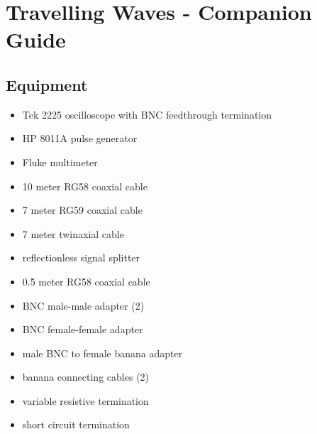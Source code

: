 \AtEndDocument{\clearpage\ifodd\value{page}\else\null\clearpage\fi} %


\chapter{Travelling Waves - Companion Guide}

\section{Equipment}

\begin{minipage}[t]{0.5\textwidth}
\begin{itemize}[noitemsep]
\item Tek 2225 oscilloscope with BNC feedthrough termination
\item HP 8011A pulse generator
\item Fluke multimeter
\item 10 meter RG58 coaxial cable
\item 7 meter RG59 coaxial cable
\item 7 meter twinaxial cable
\item reflectionless signal splitter
\end{itemize}
\end{minipage}
\begin{minipage}[t]{0.5\textwidth}
\begin{itemize}[noitemsep]
\item 0.5 meter RG58 coaxial cable
\item BNC male-male adapter (2)
\item BNC female-female adapter
\item male BNC to female banana adapter
\item banana connecting cables (2)
\item variable resistive termination
\item short circuit termination
\end{itemize}
\end{minipage}

